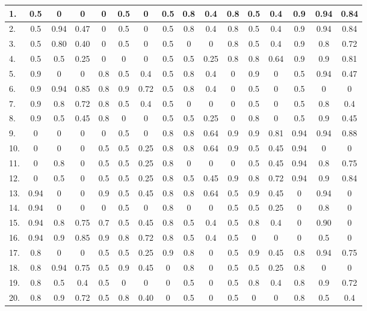\documentclass[a4paper,openany]{book}
\begin{document}
\begin{center}
\begin{landscape}
\begin{longtable}[c]{|l|c|c|c|c|c|c|c|c|c|c|c|c|c|c|c|}
							1. & 0.5 & 0 & 0 & 0 & 0.5 & 0 & 0.5 & 0.8 & 0.4 & 0.8 & 0.5 & 0.4 & 0.9 & 0.94 & 0.84 \\
							\hline
							2. & 0.5 & 0.94 & 0.47 & 0 & 0.5 & 0  & 0.5 & 0.8 & 0.4 & 0.8 & 0.5 & 0.4 & 0.9 & 0.94 & 0.84\\
							\hline
							3. & 0.5 & 0.80 & 0.40 & 0 & 0.5 & 0 & 0.5 & 0 & 0 & 0.8 & 0.5 & 0.4 & 0.9 & 0.8 & 0.72 \\
							\hline
							4. & 0.5 & 0.5 & 0.25 & 0 & 0 & 0& 0.5 & 0.5 & 0.25 & 0.8 & 0.8 & 0.64 & 0.9 & 0.9 & 0.81 \\
							\hline
							5. & 0.9 & 0 & 0 & 0.8 & 0.5 & 0.4 & 0.5 & 0.8 & 0.4 & 0 & 0.9 & 0 & 0.5 & 0.94 & 0.47 \\
							\hline
							6. & 0.9 & 0.94 & 0.85 & 0.8 & 0.9 & 0.72 & 0.5 & 0.8 & 0.4 & 0 & 0.5 & 0 & 0.5 & 0 & 0  \\
							\hline
							7. & 0.9 & 0.8 & 0.72 & 0.8 & 0.5 & 0.4 & 0.5 & 0 & 0 & 0 & 0.5 & 0 & 0.5 & 0.8 & 0.4 \\
							\hline
							8. & 0.9 & 0.5 & 0.45 & 0.8 & 0 & 0 & 0.5 & 0.5 & 0.25 & 0 & 0.8 & 0 & 0.5 & 0.9 & 0.45  \\
							\hline
							9. & 0 & 0 & 0 & 0 & 0.5 & 0 & 0.8 & 0.8 & 0.64 & 0.9 & 0.9 & 0.81 & 0.94 & 0.94 & 0.88  \\
							\hline
							10. & 0 & 0 & 0 & 0.5 & 0.5 & 0.25 & 0.8 & 0.8 & 0.64 & 0.9 & 0.5 & 0.45 & 0.94 & 0 & 0  \\
							\hline
							11. & 0 & 0.8 & 0 & 0.5 & 0.5 & 0.25 & 0.8 & 0 & 0 & 0 & 0.5 & 0.45 & 0.94 & 0.8 & 0.75  \\
							\hline
							12. & 0 & 0.5 & 0 & 0.5 & 0.5 & 0.25 & 0.8 & 0.5 & 0.45 & 0.9 & 0.8 & 0.72 & 0.94 & 0.9 & 0.84  \\
							\hline
							13. & 0.94 & 0 & 0 & 0.9 & 0.5 & 0.45 & 0.8 & 0.8 & 0.64 & 0.5 & 0.9 & 0.45 & 0 & 0.94 & 0 \\
							\hline
							14. & 0.94 & 0 & 0 & 0 & 0.5 & 0  & 0.8 & 0 & 0 & 0.5 & 0.5 & 0.25 & 0 & 0.8 & 0  \\
							\hline
							15. & 0.94 & 0.8 & 0.75 & 0.7 & 0.5 & 0.45 & 0.8 & 0.5 & 0.4 & 0.5 & 0.8 & 0.4 & 0 & 0.90 & 0  \\
							\hline
							16. & 0.94 & 0.9 & 0.85 & 0.9 & 0.8 & 0.72 & 0.8 & 0.5 & 0.4 & 0.5 & 0 & 0 & 0 & 0.5 & 0  \\
							\hline
							17. & 0.8 & 0 & 0 & 0.5 & 0.5 & 0.25 & 0.9 & 0.8 & 0 & 0.5 & 0.9 & 0.45 & 0.8 & 0.94 & 0.75  \\
							\hline
							18. & 0.8 & 0.94 & 0.75 & 0.5 & 0.9 & 0.45 & 0 & 0.8 & 0 & 0.5 & 0.5 & 0.25 & 0.8 & 0 & 0  \\
							\hline
							19. & 0.8 & 0.5 & 0.4 & 0.5 & 0 & 0 & 0 & 0.5 & 0 & 0.5 & 0.8 & 0.4 & 0.8 & 0.9 & 0.72  \\
							\hline
							20. & 0.8 & 0.9 & 0.72 & 0.5 & 0.8 & 0.40 & 0 & 0.5 & 0 & 0.5 & 0 & 0 & 0.8 & 0.5 & 0.4  \\
							\hline
						\end{longtable}
					\end{landscape}
				\end{center}
\end{document}
